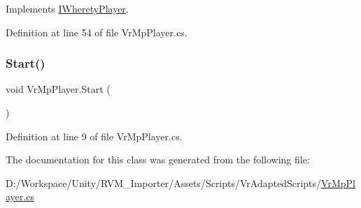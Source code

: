Implements \mbox{\hyperlink{interface_i_wherety_player_afd5f6bbda4034e3c00502d0ac26474c1}{I\+Wherety\+Player}}.



Definition at line 54 of file Vr\+Mp\+Player.\+cs.

\mbox{\label{class_vr_mp_player_ac5ce52a2494308d5d8a7edc6e6e6f5d3}} 
\subsubsection{\texorpdfstring{Start()}{Start()}}
{\footnotesize\ttfamily void Vr\+Mp\+Player.\+Start (\begin{DoxyParamCaption}{ }\end{DoxyParamCaption})}



Definition at line 9 of file Vr\+Mp\+Player.\+cs.



The documentation for this class was generated from the following file\+:\begin{DoxyCompactItemize}
\item 
D\+:/\+Workspace/\+Unity/\+R\+V\+M\+\_\+\+Importer/\+Assets/\+Scripts/\+Vr\+Adapted\+Scripts/\mbox{\hyperlink{_vr_mp_player_8cs}{Vr\+Mp\+Player.\+cs}}\end{DoxyCompactItemize}
